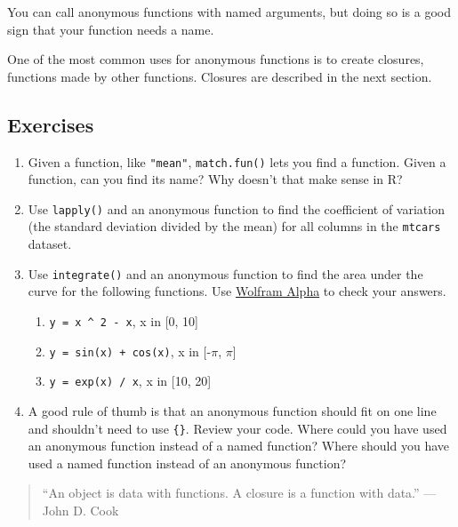 You can call anonymous functions with named arguments, but doing so is a
good sign that your function needs a name.

One of the most common uses for anonymous functions is to create
closures, functions made by other functions. Closures are described in
the next section.

\subsection{Exercises}

\begin{enumerate}
\def\labelenumi{\arabic{enumi}.}
\item
  Given a function, like \texttt{"mean"}, \texttt{match.fun()} lets you
  find a function. Given a function, can you find its name? Why doesn't
  that make sense in R?
\item
  Use \texttt{lapply()} and an anonymous function to find the
  coefficient of variation (the standard deviation divided by the mean)
  for all columns in the \texttt{mtcars} dataset.
\item
  Use \texttt{integrate()} and an anonymous function to find the area
  under the curve for the following functions. Use
  \href{http://www.wolframalpha.com/}{Wolfram Alpha} to check your
  answers.

  \begin{enumerate}
  \def\labelenumii{\arabic{enumii}.}
  \itemsep1pt\parskip0pt
  \item
    \texttt{y = x \^{} 2 - x}, x in {[}0, 10{]}
  \item
    \texttt{y = sin(x) + cos(x)}, x in {[}-\(\pi\), \(\pi\){]}
  \item
    \texttt{y = exp(x) / x}, x in {[}10, 20{]}
  \end{enumerate}
\item
  A good rule of thumb is that an anonymous function should fit on one
  line and shouldn't need to use \texttt{\{\}}. Review your code. Where
  could you have used an anonymous function instead of a named function?
  Where should you have used a named function instead of an anonymous
  function?
\end{enumerate}


\begin{quote}
``An object is data with functions. A closure is a function with data.''
--- John D. Cook
\end{quote}

